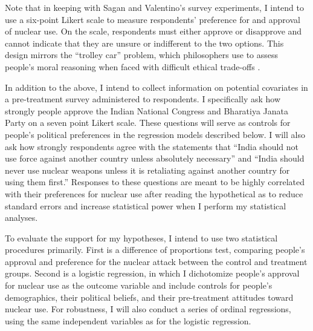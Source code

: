\documentclass[12pt]{article}
\begin{document}
Note that in keeping with Sagan and Valentino's survey experiments, I intend to use a six-point Likert scale to measure respondents' preference for and approval of nuclear use. On the scale, respondents must either approve or disapprove and cannot indicate that they are unsure or indifferent to the two options. This design mirrors the ``trolley car'' problem, which philosophers use to assess people's moral reasoning when faced with difficult ethical trade-offs \citep{sagan_does_2020}.

In addition to the above, I intend to collect information on potential covariates in a pre-treatment survey administered to respondents. I specifically ask how strongly people approve the Indian National Congress and Bharatiya Janata Party on a seven point Likert scale. These questions will serve as controls for people's political preferences in the regression models described below. I will also ask how strongly respondents agree with the statements that ``India should not use force against another country unless absolutely necessary'' and ``India should never use nuclear weapons unless it is retaliating against another country for using them first.'' Responses to these questions are meant to be highly correlated with their preferences for nuclear use after reading the hypothetical as to reduce standard errors and increase statistical power when I perform my statistical analyses.

To evaluate the support for my hypotheses, I intend to use two statistical procedures primarily. First is a difference of proportions test, comparing people's approval and preference for the nuclear attack between the control and treatment groups. Second is a logistic regression, in which I dichotomize people's approval for nuclear use as the outcome variable and include controls for people's demographics, their political beliefs, and their pre-treatment attitudes toward nuclear use. For robustness, I will also conduct a series of ordinal regressions, using the same independent variables as for the logistic regression.



\end{document}

